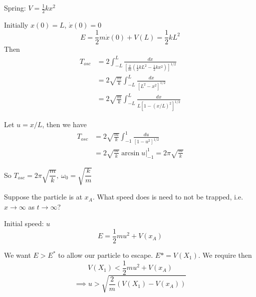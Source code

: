 \documentclass[10pt]{scrartcl}
\begin{document}
\begin{example}[Spring]

Spring: $V = \frac{1}{2}kx^2$
\begin{center}
\end{center}

Initially $x(0) = L$, $\dot{x}(0) = 0$
\[E = \frac{1}{2}m\dot{x}(0) + V(L) = \frac{1}{2}kL^2\]
Then 
\setlength{\jot}{10pt}
\begin{align*}T_{osc} &= 2\int_{-L}^L \frac{dx}{[\frac{2}{m}(\frac{1}{2}kL^2 - \frac{1}{2}kx^2)]^{1/2}}\\
&= 2\sqrt{\frac{m}{k}} \int_{-L}^{L} \frac{dx}{[L^2-x^2]^{1/2}}\\
&= 2\sqrt{\frac{m}{k}} \int_{-L}^{L} \frac{dx}{L[1-(x/L)^2]^{1/2}}
\end{align*}

Let $u = x/L$, then we have 
\begin{align*}
 T_{osc} &= 2\sqrt{\frac{m}{k}} \int_{-1}^{1} \frac{du}{[1-u^2]^{1/2}}\\
&= 2\sqrt{\frac{m}{k}}  \arcsin u\bigg|_{-1}^1 =  2\pi \sqrt{\frac{m}{k}} 
\end{align*}


So $T_{osc} =  2\pi \sqrt{\dfrac{m}{k}},~ \omega_0 = \sqrt{\dfrac{k}{m}}$
	
\end{example}

Suppose the particle is at $x_A$. What speed does is need to not be trapped, i.e. $x\to \infty$ as $t \to \infty$?

Initial speed: $u$
\[E = \frac{1}{2}mu^2 + V(x_A)\]

We want $E > E^*$ to allow our particle to escape. $E* = V(X_1)$. We require then 
\[V(X_1) < \frac{1}{2}mu^2 + V(x_A)\]
\[\implies u > \sqrt{\frac{2}{m}(V(X_1)-V(x_A))}\] 
  \begin{center}
  \end{center}~
\end{document}
